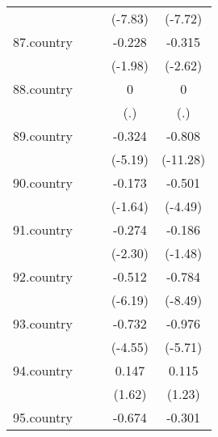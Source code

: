 {\begin{tabular}{l*{4}{c}}
            &                     &                     &     (-7.83)         &     (-7.72)         \\
[1em]
87.country  &                     &                     &      -0.228\sym{*}  &      -0.315\sym{**} \\
            &                     &                     &     (-1.98)         &     (-2.62)         \\
[1em]
88.country  &                     &                     &           0         &           0         \\
            &                     &                     &         (.)         &         (.)         \\
[1em]
89.country  &                     &                     &      -0.324\sym{***}&      -0.808\sym{***}\\
            &                     &                     &     (-5.19)         &    (-11.28)         \\
[1em]
90.country  &                     &                     &      -0.173         &      -0.501\sym{***}\\
            &                     &                     &     (-1.64)         &     (-4.49)         \\
[1em]
91.country  &                     &                     &      -0.274\sym{*}  &      -0.186         \\
            &                     &                     &     (-2.30)         &     (-1.48)         \\
[1em]
92.country  &                     &                     &      -0.512\sym{***}&      -0.784\sym{***}\\
            &                     &                     &     (-6.19)         &     (-8.49)         \\
[1em]
93.country  &                     &                     &      -0.732\sym{***}&      -0.976\sym{***}\\
            &                     &                     &     (-4.55)         &     (-5.71)         \\
[1em]
94.country  &                     &                     &       0.147         &       0.115         \\
            &                     &                     &      (1.62)         &      (1.23)         \\
[1em]
95.country  &                     &                     &      -0.674\sym{***}&      -0.301\sym{**} \\

\end{tabular}}
